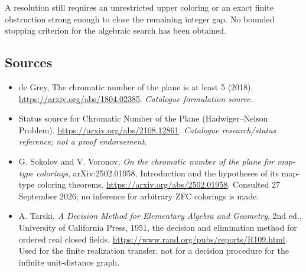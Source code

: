 \documentclass[11pt,a4paper]{article}
\numberwithin{equation}{section}
\begin{document}
A resolution still requires an unrestricted upper coloring or an exact
finite obstruction strong enough to close the remaining integer gap.
No bounded stopping criterion for the algebraic search has been obtained.
\subsection{Sources}
\begin{itemize}\raggedright
\item[\textnormal{[S1]}]\hypertarget{source:220:1}{} de Grey, The chromatic number of the plane is at least 5 (2018).
\url{https://arxiv.org/abs/1804.02385}.
{\small\textit{Catalogue formulation source.}}
\item[\textnormal{[S2]}]\hypertarget{source:220:2}{} Status source for Chromatic Number of the Plane (Hadwiger--Nelson Problem).
\url{https://arxiv.org/abs/2108.12861}.
{\small\textit{Catalogue research/status reference; not a proof endorsement.}}
\item[\textnormal{[E1]}]\hypertarget{extra:220:1}{}
G. Sokolov and V. Voronov, \emph{On the chromatic number of the plane for map-type
colorings}, arXiv:2502.01958, Introduction and the hypotheses of its
map-type coloring theorems. \url{https://arxiv.org/abs/2502.01958}.
Consulted 27 September 2026; no inference for arbitrary ZFC colorings is made.
\item[\textnormal{[E2]}]\hypertarget{extra:220:2}{}
A. Tarski, \emph{A Decision Method for Elementary Algebra and Geometry},
2nd ed., University of California Press, 1951, the decision and elimination
method for ordered real closed fields.
\url{https://www.rand.org/pubs/reports/R109.html}.
Used for the finite realization transfer, not for a decision procedure
for the infinite unit-distance graph.
\end{itemize}
\end{document}
